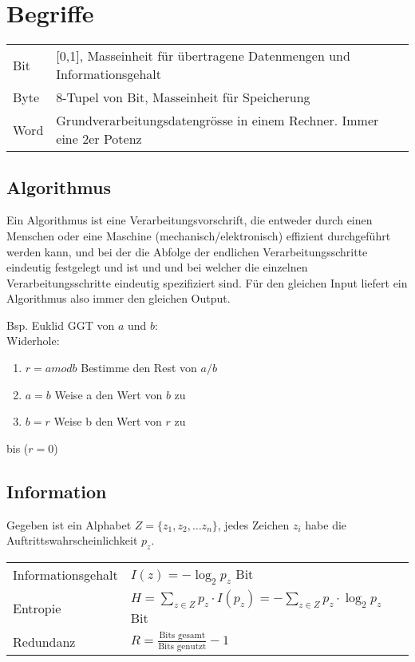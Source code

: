 \section{Begriffe}
\settowidth{\MyLenA}{Word~~}
\begin{tabular}{@{}p{\the\MyLenA}%
				@{}p{\linewidth-\the\MyLenA}}
	Bit & [0,1], Masseinheit für übertragene Datenmengen und Informationsgehalt\\
	Byte & 8-Tupel von Bit, Masseinheit für Speicherung\\
	Word & Grundverarbeitungsdatengrösse in einem Rechner. Immer eine 2er Potenz\\
\end{tabular}

\subsection{Algorithmus}
Ein Algorithmus ist eine Verarbeitungsvorschrift, die entweder durch einen Menschen oder eine Maschine (mechanisch/elektronisch)
effizient durchgeführt werden kann, und bei der die Abfolge der endlichen Verarbeitungsschritte eindeutig festgelegt und ist und
und bei welcher die einzelnen Verarbeitungsschritte eindeutig spezifiziert sind. Für den gleichen Input liefert ein Algorithmus 
also immer den gleichen Output. 

Bsp. Euklid GGT von $a$ und $b$:\\
Widerhole:
\begin{enumerate}
	\item $r = a mod b$ Bestimme den Rest von $a/b$ 
	\item $a = b$ Weise a den Wert von $b$ zu
	\item $b = r$ Weise b den Wert von $r$ zu
\end{enumerate}
bis ($r=0$)

\subsection{Information}
Gegeben ist ein Alphabet $Z = \{z_1, z_2, \dots z_n\}$, jedes Zeichen $z_i$ habe die Auftrittswahrscheinlichkeit $p_z$.

\settowidth{\MyLenA}{Informationsgehalt~~}
\begin{tabular}{@{}p{\the\MyLenA}%
				@{}p{\linewidth-\the\MyLenA}}
	Informationsgehalt & $I(z) = - \log_2{p_{z}}$ Bit\\
	Entropie			& $H = \sum_{z\in Z} p_z \cdot I(p_z) = - \sum_{z\in Z} p_z \cdot \log_2 p_z$ Bit\\
	Redundanz			& $R = \frac{\mbox{Bits gesamt}}{\mbox{Bits genutzt}} - 1$\\
\end{tabular}


